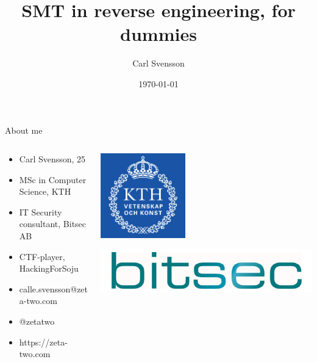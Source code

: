 \documentclass[10pt, compress]{beamer}
\title{SMT in reverse engineering, for dummies}
\date{\today}
\author{Carl Svensson}
\institute{SEC-T 2016}
\begin{document}
\maketitle

\begin{frame}{About me}
  
	\begin{columns}
		\begin{column}{0.6\textwidth}  
  
  		\begin{itemize}
		  \item Carl Svensson, 25
		  \item MSc in Computer Science, KTH
		  \item IT Security consultant, Bitsec AB
		  \item CTF-player, HackingForSoju
		  \item \faEnvelope \hskip 2mm calle.svensson@zeta-two.com
		  \item \faTwitter \hskip 2mm  @zetatwo
		  \item \faGlobe \hskip 2mm https://zeta-two.com
		\end{itemize}
		
		\end{column}
		\begin{column}{0.4\textwidth} 
			\begin{center}
			\includegraphics[width=0.4\textwidth]{images/kth.jpg}
			\end{center}
			\vspace{1cm}
			\includegraphics[width=\textwidth]{images/bitsec.jpg}
		\end{column}
	\end{columns}
  
\end{frame}
\end{document}

